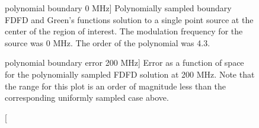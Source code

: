 \documentclass [11 pt, titlepage]{article}
\begin{document}
\begin {figure}
\begin {minipage}[t]{3.0in}
    \begin {center}
     \caption
    [polynomial boundary 0 MHz] {Polynomially sampled boundary FDFD
    and Green's functions solution to a single point source at the
    center of the region of interest.  The modulation frequency for
    the source was 0 MHz.  The order of the polynomial was 4.3.}
\end {center}
\end {minipage}\hfill
\begin {minipage}[t]{3.0in}
    \begin {center}
     \caption
    [polynomial boundary error 200 MHz] {Error as a function of space
    for the polynomially sampled FDFD solution at 200 MHz.  Note that
    the range for this plot is an order of magnitude less than the
    corresponding uniformly sampled case above.}
    \end {center}
\end {minipage}
\end {figure}
\end{document}
